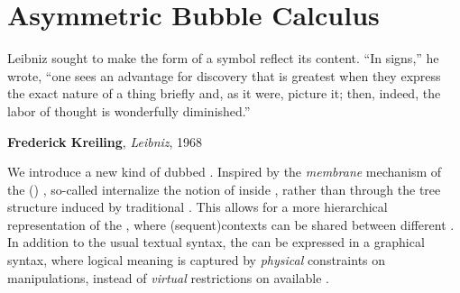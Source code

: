 \setchapterpreamble[u]{\margintoc}
\chapter{Asymmetric Bubble Calculus}

\epigraph{Leibniz sought to make the form of a symbol reflect its content. ``In
signs,'' he wrote, ``one sees an advantage for discovery that is greatest when
they express the exact nature of a thing briefly and, as it were, picture it;
then, indeed, the labor of thought is wonderfully diminished.''}
{\textbf{Frederick Kreiling}, \textit{Leibniz}, 1968}


\begin{scope}


We introduce a new kind of   dubbed
. Inspired by the \emph{membrane} mechanism of the
 (\reintro{\cham})
, so-called \emph{} internalize
the notion of  inside , rather than through the tree
structure induced by traditional . This allows for a more
hierarchical representation of the , where
\kl(sequent){contexts} can be shared between different . In
addition to the usual textual syntax, the  can be expressed
in a graphical syntax, where logical meaning is captured by \emph{physical}
constraints on  manipulations, instead of \emph{virtual}
restrictions on available .



\end{scope}
